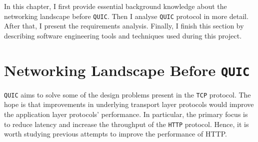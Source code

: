 \documentclass[12pt,a4paper,twoside,openright]{report}
\begin{document}











In this chapter, I first provide essential background knowledge about the networking landscape before \texttt{QUIC}. 
Then I analyse \texttt{QUIC} protocol in more detail.
After that, I present the requirements analysis.
Finally, I finish this section by describing software engineering tools and techniques used during this project.


\section{Networking Landscape Before \texttt{QUIC}}
    \texttt{QUIC} aims to solve some of the design problems present in the \texttt{TCP} protocol. The hope is that improvements in underlying transport layer protocols would improve the application layer protocols' performance.
    In particular, the primary focus is to reduce latency and increase the throughput of the \texttt{HTTP} protocol.
    Hence, it is worth studying previous attempts to improve the performance of HTTP.
\end{document}
